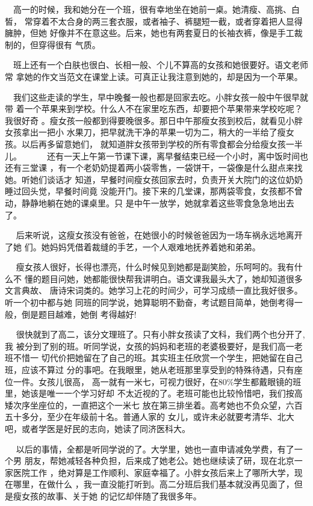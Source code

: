 \documentclass[12pt]{book}
\begin{document}
    　高一的时候，我和她分在一个班，很有幸地坐在她前一桌。她清瘦、高挑、白皙，
常穿着不太合身的两三套衣服，或者袖子、裤腿短一截，或者穿着把人显得臃肿，但她
好像并不在意这些。后来，她也有两套夏日的长袖衣裤，像是手工裁制的，但穿得很有
气质。

    　班上还有一个白肤也很白、长相一般、个儿不算高的女孩和她很要好。语文老师常
拿她的作文当范文在课堂上读。可真正让我注意到她的，却是因为一个苹果。

    　我们这些走读的学生，早中晚餐一般也都是回家去吃。小胖女孩一般中午很早就带
着一个苹果来到学校。什么人不在家里吃东西，却要把个苹果带来学校吃呢？我很好奇
。瘦女孩一般都到得要晚很多。那日中午那瘦女孩到校后，就看见小胖女孩拿出一把小
水果刀，把早就洗干净的苹果一切为二，稍大的一半给了瘦女孩。以后再多留意她们，
就知道胖女孩带到学校的所有零食都会分给瘦女孩一半儿。
　
   　 还有一天上午第一节课下课，离早餐结束已经一个小时，离中饭时间也还有三堂课
，有一个老奶奶提着两小袋零售，一袋饼干，一袋像是什么甜点来找她。听她们谈话才
知道，早餐时间瘦女孩回家去时，负责开关大院门的这位奶奶睡过回头觉，早餐时间竟
没能开门。接下来的几堂课，那两袋零食，女孩都不曾动，静静地躺在她的课桌里。只
是中午一放学，她就拿着这些零食急急地出去了。

   　 后来听说，这瘦女孩没有爸爸，在她很小的时候爸爸因为一场车祸永远地离开了她
们。她妈妈凭借着裁缝的手艺，一个人艰难地抚养着她和弟弟。

   　 瘦女孩人很好，长得也漂亮，什么时候见到她都是副笑脸，乐呵呵的。我有什么不
懂的题目问她，她都能很快帮我讲明白。语文课我最头大了，她却知道很多文言典故、
唐诗宋词类的。她学习上花的时间少，可学习成绩一直比我好很多。听一个初中都与她
同班的同学说，她算聪明不勤奋，考试题目简单，她倒考得一般，倒是题目越难，她倒
考得越好!

   　 很快就到了高二，该分文理班了。只有小胖女孩读了文科，我们两个也分开了,我
被分到了别的班。听同学说，女孩的妈妈和老班的老婆极要好，是我们高一老班不惜一
切代价把她留在了自己的班。其实班主任欣赏一个学生，把她留在自己班，应该不算过
分的事吧。在我眼里，她从老班那里享受到的特殊待遇，只有座位一件。女孩儿很高，
高一就有一米七，可视力很好，在80\%学生都戴眼镜的班里，她该是唯一一个学习好却
不太近视的了。老班可能也比较怜惜吧，我们按高矮次序坐座位的，一直把这个一米七
放在第三排坐着。高考她也不负众望，六百五十多分，至少在年级前十名。普通人家的
女儿，或许未必就要考清华、北大吧，或者学医是好民的志向，她读了同济医科大。

   　 以后的事情，全都是听同学说的了。大学里，她也一直申请减免学费，有了一个男
朋友，帮她减轻各种负担，后来成了她老公。她也继续读了研，现在北京一家医院工作
，绝对算是工作顺利、家庭幸福了。小胖女孩后来上了哪所大学，现在哪里，在做什么
，我一直没能打听到。高二分班后我们基本就没再见面了，但是瘦女孩的故事、关于她
的记忆却伴随了我很多年。
\end{document}
